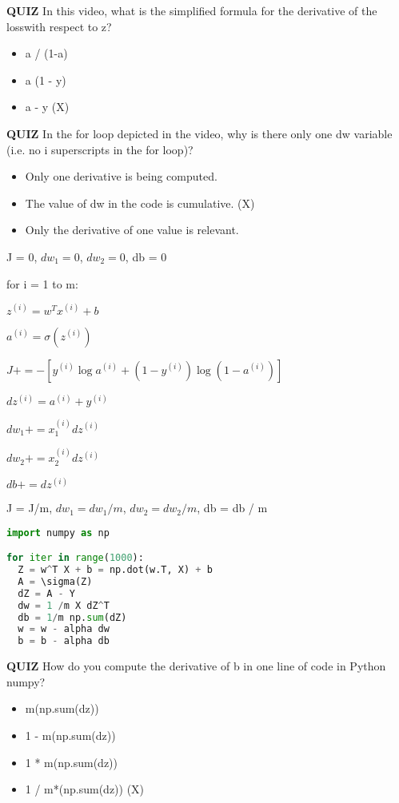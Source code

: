 \textbf{QUIZ} In this video, what is the simplified formula for the derivative of the losswith respect to z?
\begin{itemize}
    \item a / (1-a)
    \item a (1 - y)
    \item a - y (X)
\end{itemize}
\textbf{QUIZ} In the for loop depicted in the video, why is there only one dw variable (i.e. no i superscripts in the for loop)?
\begin{itemize}
    \item Only one derivative is being computed.
    \item The value of dw in the code is cumulative. (X)
    \item Only the derivative of one value is relevant.
\end{itemize}
J = 0, $dw_1 = 0$, $dw_2 = 0$, db = 0

for i = 1 to m:

  $z^{(i)} = w^T x^{(i)} + b$
  
  $a^{(i)} = \sigma(z^{(i)})$
  
  $J += - [y^{(i)} \log a^{(i)} + (1 - y^{(i)}) \log (1 - a^{(i)})]$
  
  $dz^{(i)} = a^{(i)} + y^{(i)}$
  
  $dw_1 += x^{(i)}_1 dz^{(i)}$
  
  $dw_2 += x^{(i)}_2 dz^{(i)}$
  
  $db += dz^{(i)}$
  
J = J/m, $dw_1 = dw_1/m$, $dw_2 = dw_2 / m$, db = db / m

\begin{lstlisting}[language=Python]
import numpy as np

for iter in range(1000):
  Z = w^T X + b = np.dot(w.T, X) + b
  A = \sigma(Z)
  dZ = A - Y
  dw = 1 /m X dZ^T
  db = 1/m np.sum(dZ)
  w = w - alpha dw
  b = b - alpha db
\end{lstlisting}

\textbf{QUIZ} How do you compute the derivative of b in one line of code in Python numpy?
\begin{itemize}
    \item m(np.sum(dz))
    \item 1 - m(np.sum(dz))
    \item 1 * m(np.sum(dz))
    \item 1 / m*(np.sum(dz)) (X)
\end{itemize}

